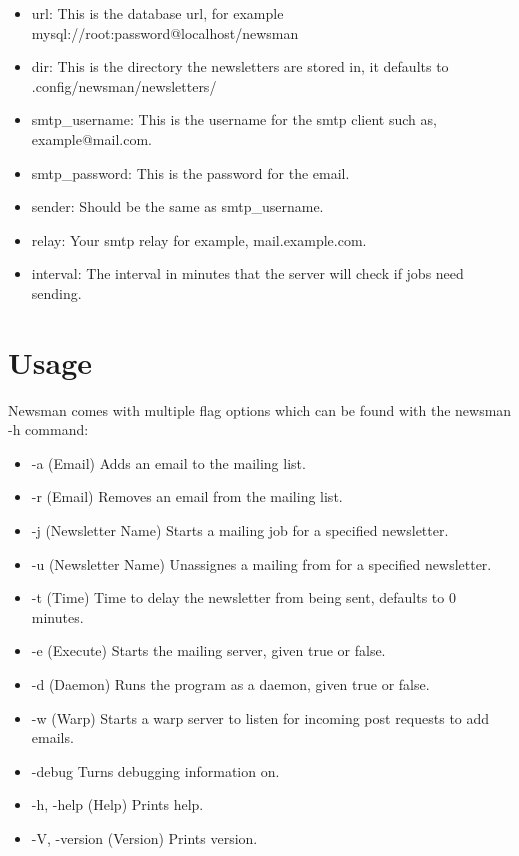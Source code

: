\documentclass[12pt]{article}
\begin{document}
\begin{itemize}
    \item url: This is the database url, for example 
        mysql://root:password@localhost/newsman 
    \item dir: This is the directory the newsletters are stored in,
        it defaults to .config/newsman/newsletters/
    \item smtp\_username: This is the username for the smtp client such as, 
        example@mail.com.
    \item smtp\_password: This is the password for the email.
    \item sender: Should be the same as smtp\_username.
    \item relay: Your smtp relay for example, mail.example.com.
    \item interval: The interval in minutes that the server will check if jobs 
        need sending.
\end{itemize}

\section{Usage}
Newsman comes with multiple flag options which can be found with the newsman -h 
command:

\begin{itemize}
    \item -a (Email) Adds an email to the mailing list.
    \item -r (Email) Removes an email from the mailing list.
    \item -j (Newsletter Name) Starts a mailing job for a specified newsletter. 
    \item -u (Newsletter Name) Unassignes a mailing from for a specified newsletter.
    \item -t (Time) Time to delay the newsletter from being sent, defaults to 
        0 minutes.
    \item -e (Execute) Starts the mailing server, given true or false.
    \item -d (Daemon) Runs the program as a daemon, given true or false. 
    \item -w (Warp) Starts a warp server to listen for incoming post requests to add emails.
    \item -\-debug Turns debugging information on.
    \item -h, -\-help (Help) Prints help.
    \item -V, -\-version (Version) Prints version.
\end{itemize}
\end{document}
